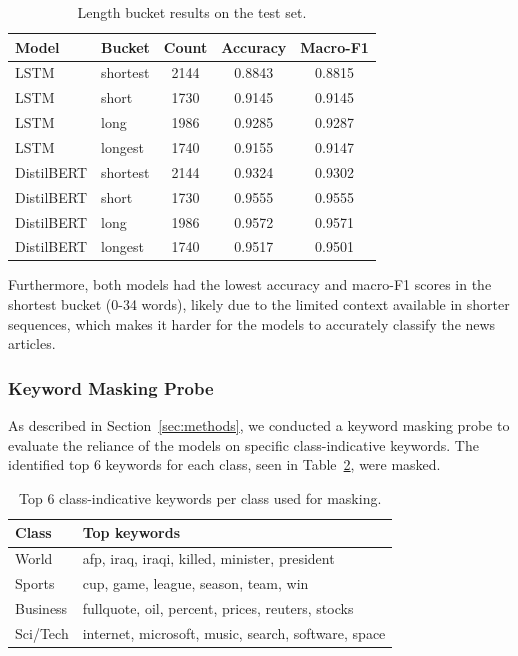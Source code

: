 \begin{table}[H]
\centering
\caption{Length bucket results on the test set.}
\label{tab:length_buckets}
\begin{tabular}{llccc}
\toprule
\textbf{Model} & \textbf{Bucket} & \textbf{Count} & \textbf{Accuracy} & \textbf{Macro-F1} \\
\midrule
LSTM & shortest & 2144 & 0.8843 & 0.8815 \\
LSTM & short & 1730 & 0.9145 & 0.9145 \\
LSTM & long & 1986 & 0.9285 & 0.9287 \\
LSTM & longest & 1740 & 0.9155 & 0.9147 \\
\midrule
DistilBERT & shortest & 2144 & 0.9324 & 0.9302 \\
DistilBERT & short & 1730 & 0.9555 & 0.9555 \\
DistilBERT & long & 1986 & 0.9572 & 0.9571 \\
DistilBERT & longest & 1740 & 0.9517 & 0.9501 \\
\bottomrule
\end{tabular}
\end{table}


Furthermore, both models had the lowest accuracy and macro-F1 scores in the shortest bucket (0-34 words), likely due to the limited context available in shorter sequences, which makes it harder for the models to accurately classify the news articles.

\subsubsection{Keyword Masking Probe}

As described in Section~\ref{sec:methods}, we conducted a keyword masking probe to evaluate the reliance of the models on specific class-indicative keywords. The identified top 6 keywords for each class, seen in Table~\ref{tab:top_keywords}, were masked.


\begin{table}[H]
    \centering
    \caption{Top 6 class-indicative keywords per class used for masking.}
\label{tab:top_keywords}
\begin{tabular}{ll}
\toprule
\textbf{Class} & \textbf{Top keywords} \\
\midrule
World & afp, iraq, iraqi, killed, minister, president \\
Sports & cup, game, league, season, team, win \\
Business & fullquote, oil, percent, prices, reuters, stocks \\
Sci/Tech & internet, microsoft, music, search, software, space \\
\bottomrule
\end{tabular}
\end{table}

